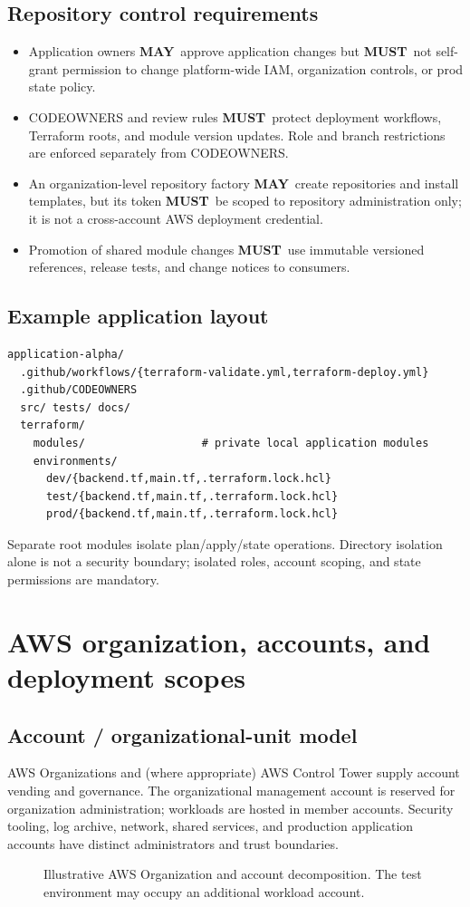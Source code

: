 \documentclass[10pt,letterpaper]{article}
\newcommand{\must}{\textbf{MUST}}
\newcommand{\may}{\textbf{MAY}}
\begin{document}
\subsection{Repository control requirements}
\begin{itemize}
\item Application owners \may\ approve application changes but \must\ not self-grant permission to change platform-wide IAM, organization controls, or prod state policy.
\item CODEOWNERS and review rules \must\ protect deployment workflows, Terraform roots, and module version updates. Role and branch restrictions are enforced separately from CODEOWNERS.
\item An organization-level repository factory \may\ create repositories and install templates, but its token \must\ be scoped to repository administration only; it is not a cross-account AWS deployment credential.
\item Promotion of shared module changes \must\ use immutable versioned references, release tests, and change notices to consumers.
\end{itemize}
\subsection{Example application layout}
\begin{verbatim}
application-alpha/
  .github/workflows/{terraform-validate.yml,terraform-deploy.yml}
  .github/CODEOWNERS
  src/ tests/ docs/
  terraform/
    modules/                  # private local application modules
    environments/
      dev/{backend.tf,main.tf,.terraform.lock.hcl}
      test/{backend.tf,main.tf,.terraform.lock.hcl}
      prod/{backend.tf,main.tf,.terraform.lock.hcl}
\end{verbatim}
Separate root modules isolate plan/apply/state operations. Directory isolation alone is not a security boundary; isolated roles, account scoping, and state permissions are mandatory.

\section{AWS organization, accounts, and deployment scopes}
\subsection{Account / organizational-unit model}
AWS Organizations and (where appropriate) AWS Control Tower supply account vending and governance. The organizational management account is reserved for organization administration; workloads are hosted in member accounts. Security tooling, log archive, network, shared services, and production application accounts have distinct administrators and trust boundaries.
\begin{figure}[htbp]\centering\resizebox{0.96\linewidth}{!}{}\caption{Illustrative AWS Organization and account decomposition. The test environment may occupy an additional workload account.}\end{figure}
\end{document}
